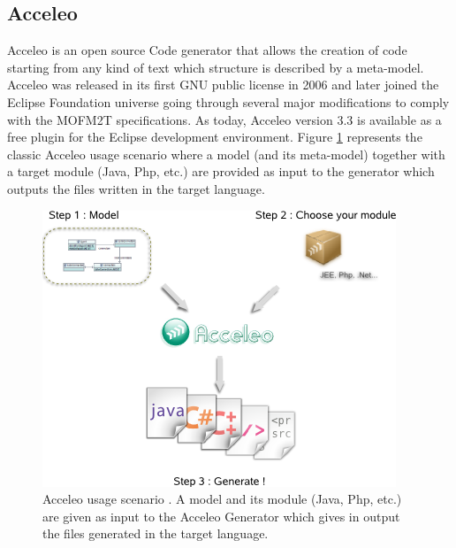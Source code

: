 \subsection{Acceleo}
\label{acceleo}
Acceleo is an open source Code generator that allows the creation of code starting from any kind of text which structure is described by a meta-model. Acceleo was released in its first GNU public license in 2006 and later joined the Eclipse Foundation universe going through several major modifications to comply with the MOFM2T specifications. As today, Acceleo version 3.3 is available as a free plugin for the Eclipse development environment. Figure \ref{fig:AcceleoScenario} represents the classic Acceleo usage scenario where a model (and its meta-model) together with a target module (Java, Php, etc.) are provided as input to the generator which outputs the files written in the target language.

\begin{figure}
  \begin{center}
    \includegraphics[scale=0.9]{pictures/Acceleo-scenario-en.png}
    \caption{Acceleo usage scenario \cite{AcceleoPresentation}. A model and its module (Java, Php, etc.) are given as input to the Acceleo Generator which gives in output the files generated in the target language.}
    \label{fig:AcceleoScenario}
  \end{center}
\end{figure}

